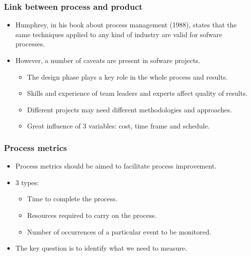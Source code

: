 \documentclass{beamer}
\begin{document}

\begin{frame}
 \frametitle{Link between process and product}
 \begin{itemize}
  \item Humphrey, in his book about process management (1988), states that
the same techniques applied to any kind of industry are valid for sofware
processes.
  \item However, a number of caveats are present in sofware projects.
  \begin{itemize}
   \item The design phase plays a key role in the whole process and results.
   \item Skills and experience of team leaders and experts affect quality of results.
   \item Different projects may need different methodologies and approaches.
   \item Great influence of 3 variables: cost, time frame and schedule.
  \end{itemize}

  \end{itemize}

\end{frame}


\begin{frame}
 \frametitle{Process metrics}
 \begin{itemize}
  \item Process metrics should be aimed to facilitate process improvement.
  \item 3 types:
  \begin{itemize}
   \item Time to complete the process.
   \item Resources required to carry on the process.
   \item Number of occurrences of a particular event to be monitored.
  \end{itemize}

  \item The key question is to identify what we need to measure.
  \end{itemize}

\end{frame}

\end{document}
